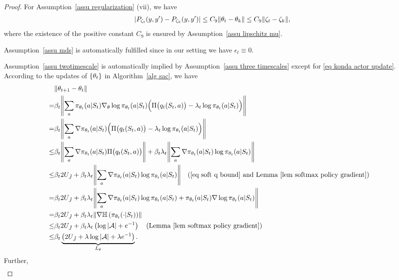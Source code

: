 \documentclass[twoside,11pt]{article}
\newcommand{\fA}{\mathcal{A}}
\newcommand{\na}{{|\fA|}}
\newcommand{\ent}[1]{\mathbb{H}\left(#1\right)}
\numberwithin{assucounter}{section}
\begin{document}
\begin{proof}
  For Assumption~\ref{assu regularization} (vii),
  we have
  \begin{align}
    \abs{P_{\zeta_t}(y, y') - P_{\zeta_k}(y, y')} \leq C_9 \norm{\theta_t - \theta_k} \leq  C_9 \norm{\zeta_t - \zeta_k},
  \end{align}
  where the existence of the positive constant $C_9$ is ensured by Assumption~\ref{assu lipschitz mu}.

  Assumption~\ref{assu mds} is automatically fulfilled since in our setting we have $\epsilon_t \equiv 0$.

  Assumption~\ref{assu twotimescale} is automatically implied by Assumption~\ref{assu three timescales} except for \eqref{eq konda actor update}.
  According to the updates of $\qty{\theta_t}$ in Algorithm~\ref{alg sac},
  we have
  \begin{align}
    \label{eq ltheta sac detailed}
    &\norm{\theta_{t+1} - \theta_t} \\
    =& \beta_t \norm{\sum_a \pi_{\theta_t}(a|S_t)\nabla_\theta \log \pi_{\theta_t}(a | S_t) \Big( \Pi \big(q_t(S_t, a)\big) - \lambda_t \log \pi_{\theta_t}(a | S_t)\Big)}  \\
    =& \beta_t \norm{\sum_a \nabla \pi_{\theta_t}(a|S_t) \Big( \Pi \big(q_t(S_t, a)\big) - \lambda_t \log \pi_{\theta_t}(a | S_t)\Big)}  \\
    \leq& \beta_t \norm{\sum_a \nabla \pi_{\theta_t}(a|S_t) \Pi \big(q_t(S_t, a)\big)} + \beta_t \lambda_t \norm{\sum_a \nabla \pi_{\theta_t}(a|S_t)\log \pi_{\theta_t}(a | S_t)}  \\
    \leq& \beta_t 2U_{\tilde J} + \beta_t \lambda_t \norm{\sum_a \nabla \pi_{\theta_t}(a|S_t)\log \pi_{\theta_t}(a | S_t)} \qq{(\eqref{eq soft q bound} and Lemma~\ref{lem softmax policy gradient})}  \\
    =& \beta_t 2U_{\tilde J} + \beta_t \lambda_t \norm{\sum_a \nabla \pi_{\theta_t}(a|S_t)\log \pi_{\theta_t}(a | S_t) + \pi_{\theta_t}(a|S_t) \nabla \log \pi_{\theta_t}(a|S_t)} \\
    =& \beta_t 2U_{\tilde J} + \beta_t \lambda_t \norm{\nabla \ent{\pi_{\theta_t}(\cdot|S_t)}} \\
    \leq& \beta_t 2U_{\tilde J} + \beta_t \lambda_t \left(\log \na + e^{-1}\right) \qq{(Lemma~\ref{lem softmax policy gradient})} \\
    \label{eq ltheta sac}
    \leq& \beta_t \underbrace{\left(2U_{\tilde J} + \lambda \log \na + \lambda e^{-1}\right)}_{L_\theta}.
  \end{align}
  Further,
  \begin{align}

\end{align}
\end{proof}
\end{document}
